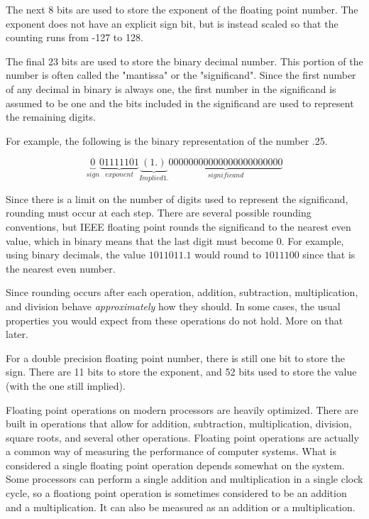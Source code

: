 The next 8 bits are used to store the exponent of the floating point number.
The exponent does not have an explicit sign bit, but is instead scaled so that the counting runs from -127 to 128.

The final 23 bits are used to store the binary decimal number.
This portion of the number is often called the "mantissa" or the "significand".
Since the first number of any decimal in binary is always one, the first number in the significand is assumed to be one and the bits included in the significand are used to represent the remaining digits.

For example, the following is the binary representation of the number .25.

\begin{equation*}
\underbrace{0}_{sign} \underbrace{01111101}_{exponent}\underbrace{(1.)}_{Implied 1.} \underbrace{00000000000000000000000}_{significand}
\end{equation*}

Since there is a limit on the number of digits used to represent the significand, rounding must occur at each step.
There are several possible rounding conventions, but IEEE floating point rounds the significand to the nearest even value, which in binary means that the last digit must become 0.
For example, using binary decimals, the value $1011011.1$ would round to $1011100$ since that is the nearest even number.

Since rounding occurs after each operation, addition, subtraction, multiplication, and division behave \textit{approximately} how they should.
In some cases, the usual properties you would expect from these operations do not hold.
More on that later.

For a double precision floating point number, there is still one bit to store the sign.
There are 11 bits to store the exponent, and 52 bits used to store the value (with the one still implied).

Floating point operations on modern processors are heavily optimized.
There are built in operations that allow for addition, subtraction, multiplication, division, square roots, and several other operations.
Floating point operations are actually a common way of measuring the performance of computer systems.
What is considered a single floating point operation depends somewhat on the system.
Some processors can perform a single addition and multiplication in a single clock cycle, so a floationg point operation is sometimes considered to be an addition and a multiplication.
It can also be measured as an addition or a multiplication.

